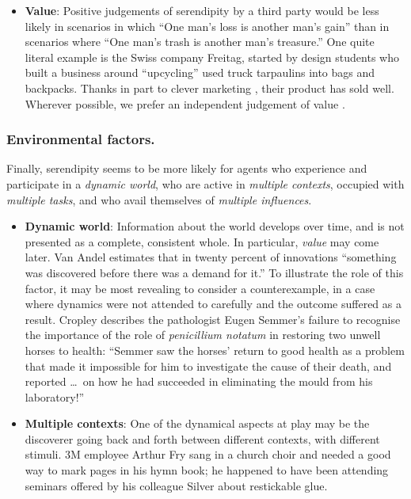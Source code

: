 \begin{itemize}
\item \textbf{Value}: 
  Positive judgements of serendipity by a third party would be less
  likely in scenarios in which ``One man's loss is another man's
  gain'' than in scenarios where ``One man's trash is another man's
  treasure.''  One quite literal example is the Swiss
  company Freitag, started by design students who built a business
  around ``upcycling'' used truck tarpaulins into bags and backpacks.
  Thanks in part to clever marketing \cite[pp. 54--55,
    68--69,]{russo2010companies}, their product has sold well.
  Wherever possible, we prefer an independent judgement of value
  \cite{jordanous:12}.
\end{itemize}

\subsubsection*{Environmental factors.}

Finally, serendipity seems to be more likely for agents who experience and participate in a \emph{dynamic world}, who are active in \emph{multiple contexts}, occupied with \emph{multiple tasks}, and who avail themselves of \emph{multiple influences}.

\begin{itemize}
\item \textbf{Dynamic world}: Information about the world develops
  over time, and is not presented as a complete, consistent whole.  In
  particular, \emph{value} may come later.  Van Andel
  \citeyear[p. 643]{van1994anatomy} estimates that in twenty percent
  of innovations ``something was discovered before there was a demand
  for it.''  To illustrate the role of this factor, it may be most
  revealing to consider a counterexample, in a case where dynamics were
  not attended to carefully and the outcome suffered as a result.
  Cropley \citeyear{cropley2006praise} describes the pathologist Eugen Semmer's
  failure to recognise the importance of the role of \emph{penicillium notatum}
  in restoring two unwell horses to health: ``Semmer saw the horses'
  return to good health as a problem that made it impossible for him
  to investigate the cause of their death, and reported \ldots\ on
  how he had succeeded in eliminating the mould from his laboratory!''
\end{itemize}

\begin{itemize}
\item \textbf{Multiple contexts}: One of the dynamical aspects at play
  may be the discoverer going back and forth between different
  contexts, with different stimuli.  3M employee Arthur Fry sang in a
  church choir and needed a good way to mark pages in his hymn book;
  he happened to have been attending seminars offered by his colleague
  Silver about restickable glue.
\end{itemize}

